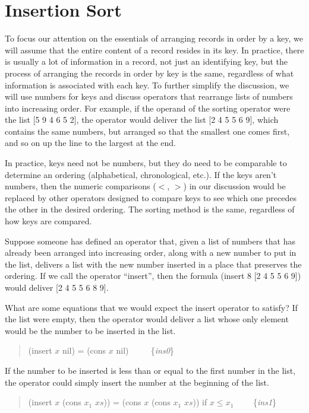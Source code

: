 \section{Insertion Sort}
\label{sec:insertion-sort}

To focus our attention on the essentials of
arranging records in order by a key, we will
assume that the entire content of a record
resides in its key.
In practice, there is usually a lot of information
in a record, not just an identifying key,
but the process of arranging the records
in order by key is the same, regardless
of what information is associated with each key.
To further simplify the discussion,
we will use numbers for keys
and discuss operators that rearrange lists
of numbers into increasing order.
For example, if the operand of the sorting
operator were the list [5 9 4 6 5 2],
the operator would deliver the list [2 4 5 5 6 9],
which contains the same numbers, but arranged so
that the smallest one comes first, and so on up the
line to the largest at the end.

In practice, keys need not be numbers,
but they do need to be comparable
to determine an ordering (alphabetical, chronological, etc.).
If the keys aren't numbers,
then the numeric comparisons
($<$, $>$) in our discussion would be replaced by
other operators designed to compare
keys to see which one precedes the other
in the desired ordering.
The sorting method is the same, regardless
of how keys are compared.

Suppose someone has defined an operator that,
given a list of numbers that has
already been arranged into increasing order,
along with a new number to put in the list,
delivers a list with the new number inserted
in a place that preserves the ordering.
If we call the operator ``insert'', then
the formula (insert 8 [2 4 5 5 6 9]) would
deliver [2 4 5 5 6 8 9].

What are some equations that we would expect
the insert operator to satisfy?
If the list were empty, then the operator
would deliver a list whose only element would
be the number to be inserted in the list.

\begin{quote}
(insert $x$ nil) = (cons $x$ nil) ~~~~ \{\emph{ins0}\}
\end{quote}

If the number to be inserted is less than or equal to the
first number in the list, the operator could simply
insert the number at the beginning of the list.

\begin{quote}
(insert $x$ (cons $x_1$ $xs$)) = (cons $x$ (cons $x_1$ $xs$)) if $x \le x_1$ ~~~~\{\emph{ins1}\}
\end{quote}

